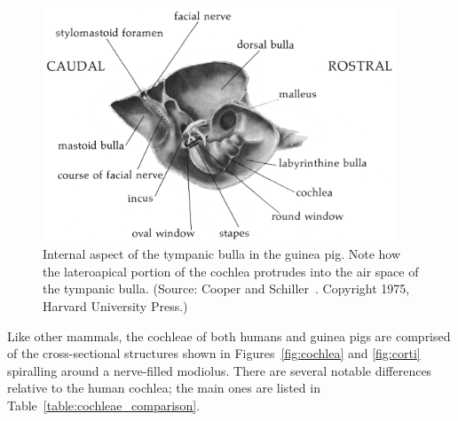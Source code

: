 \begin{figure}[p]
	\centering
	\includegraphics[height=7cm]{Validation/tympanic_bulla}
	\caption[Internal aspect of the tympanic bulla]{Internal aspect of the
	tympanic bulla in the guinea pig. Note how the lateroapical portion of the
	cochlea protrudes into the air space of the tympanic bulla. (Source: Cooper and
	Schiller~\cite{cooper1975}. Copyright \textcopyright{} 1975, Harvard
	University Press.)}
	\label{fig:guinea_pig_bulla}
\end{figure}

Like other mammals, the cochleae of both humans and guinea pigs are comprised
of the cross-sectional structures shown in Figures~\ref{fig:cochlea} and
\ref{fig:corti} spiralling around a nerve-filled modiolus. There are several
notable differences relative to the human cochlea; the main ones are listed in
Table~\ref{table:cochleae_comparison}.


